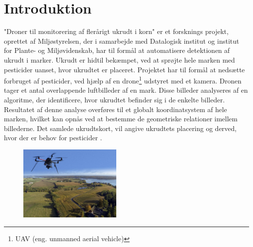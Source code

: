 \chapter{Introduktion} \label{sec:intro}
"Droner til monitorering af flerårigt ukrudt i korn"$ $ er et forsknings projekt, oprettet af Miljøstyrelsen, der i samarbejde med Datalogisk institut og institut for Plante- og Miljøvidenskab, har til formål at automatisere detektionen af ukrudt i marker.
Ukrudt er hidtil bekæmpet, ved at sprøjte hele marken med pesticider uanset, hvor ukrudtet er placeret. Projektet har til formål at nedsætte forbruget af pesticider, ved hjælp af en drone\footnote{UAV (eng. unmanned aerial vehicle)} udstyret med et kamera. Dronen tager et antal overlappende luftbilleder af en mark. Disse billeder analyseres af en algoritme, der identificere, hvor ukrudtet befinder sig i de enkelte billeder. Resultatet af denne analyse overføres til et globalt koordinatsystem af hele marken, hvilket kan opnås ved at bestemme de geometriske relationer imellem billederne. Det samlede ukrudtskort, vil angive ukrudtets placering og derved, hvor der er behov for pesticider \cite{drone}.
\begin{figure}[H]
    \centering
    \includegraphics[width=0.45\textwidth]{fig/drone4.jpg}
     \vspace{-0.5em}
    \begin{center}    
    \label{fig:difference}
     \end{center}
     \vspace{-3em}
  \end{figure} \noindent
